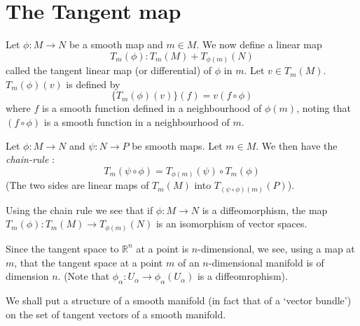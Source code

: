 \section*{The Tangent map}
\pageoriginale

Let $\phi:M\to N$ be a smooth map and $m\in M$. We now define a linear map
$$
T_{m}(\phi):T_{m}(M)+T_{\phi(m)}(N)
$$
called the tangent linear map (or differential) of $\phi$ in $m$. Let $v\in T_{m}(M)$. $T_{m}(\phi)(v)$ is defined by
$$
\{T_{m}(\phi)(v)\}(f)=v(f\circ \phi)
$$
where $f$ is a smooth function defined in a neighbourhood of $\phi(m)$, noting that $(f\circ \phi)$ is a smooth function in a neighbourhood of $m$. 

Let $\phi:M\to N$ and $\psi:N\to P$ be smooth maps. Let $m\in M$. We then have the {\em chain-rule} :
$$
T_{m}(\psi\circ \phi)=T_{\phi(m)}(\psi)\circ T_{m}(\phi)
$$
(The two sides are linear maps of $T_{m}(M)$ into $T_{(\psi\circ\phi)(m)}(P)$).

Using the chain rule we see that if $\phi:M\to N$ is a diffeomorphism, the map $T_{m}(\phi):T_{m}(M)\to T_{\phi(m)}(N)$ is an isomorphism of vector spaces.

Since the tangent space to $\mathbb{R}^{n}$ at a point is $n$-dimensional, we see, using a map at $m$, that the tangent space at a point $m$ of an $n$-dimensional manifold is of dimension $n$. (Note that $\phi_{\alpha}:U_{\alpha}\to \phi_{\alpha}(U_{\alpha})$ is a diffeomrophism).

We shall put a structure of a smooth manifold (in fact that of a `vector bundle') on the set of tangent vectors of a smooth manifold.





